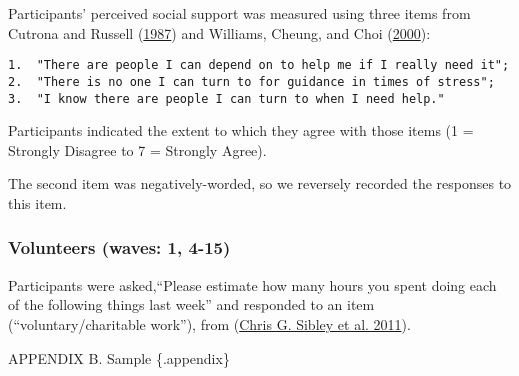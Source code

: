 \documentclass[
  singlecolumn]{report}
\begin{document}
Participants' perceived social support was measured using three items
from Cutrona and Russell (\protect\hyperlink{ref-cutrona1987}{1987}) and
Williams, Cheung, and Choi
(\protect\hyperlink{ref-williams_cyberostracism_2000}{2000}):

\begin{verbatim}
1.  "There are people I can depend on to help me if I really need it";
2.  "There is no one I can turn to for guidance in times of stress";
3.  "I know there are people I can turn to when I need help." 
\end{verbatim}

Participants indicated the extent to which they agree with those items
(1 = Strongly Disagree to 7 = Strongly Agree).

The second item was negatively-worded, so we reversely recorded the
responses to this item.

\hypertarget{volunteers-waves-1-4-15}{%
\subsubsection{Volunteers (waves: 1,
4-15)}\label{volunteers-waves-1-4-15}}

Participants were asked,``Please estimate how many hours you spent doing
each of the following things last week'' and responded to an item
(``voluntary/charitable work''), from
(\protect\hyperlink{ref-sibley2011}{Chris G. Sibley et al. 2011}).

\newpage{}

APPENDIX B. Sample \{.appendix\}
\end{document}
